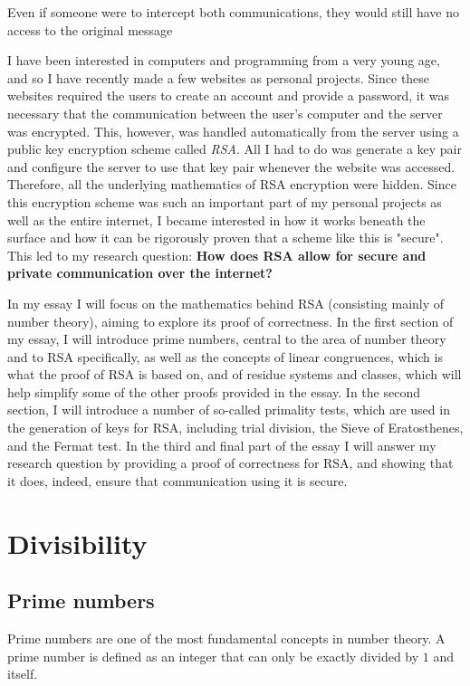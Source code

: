 \documentclass[12pt, titlepage]{article}
\begin{document}
    Even if someone were to intercept both communications, they would still have no access
    to the original message

    I have been interested in computers and programming from a very young age, and so I have
    recently made a few websites as personal projects. Since these websites required the
    users to create an account and provide a password, it was necessary that the
    communication between the user's computer and the server was encrypted. This, however,
    was handled automatically from the server using a public key encryption scheme called
    \emph{RSA}. All I had to do was generate a key pair and configure the server to use that
    key pair whenever the website was accessed.  Therefore, all the underlying mathematics
    of RSA encryption were hidden. Since this encryption scheme was such an important part
    of my personal projects as well as the entire internet, I became interested in how it
    works beneath the surface and how it can be rigorously proven that a scheme like this is
    "secure". This led to my research question: \textbf{How does RSA allow for secure and
    private communication over the internet?}

    In my essay I will focus on the mathematics behind RSA (consisting mainly of number
    theory), aiming to explore its proof of correctness. In the first section of my essay, I
    will introduce prime numbers, central to the area of number theory and to
    RSA specifically, as well as the concepts of linear congruences, which is what the proof
    of RSA is based on, and of residue systems and classes, which will help simplify some
    of the other proofs provided in the essay. In the second section, I will introduce a
    number of so-called primality tests, which are used in the generation of keys for RSA,
    including trial division, the Sieve of Eratosthenes, and the Fermat test. In the third
    and final part of the essay I will answer my research question by providing a proof of
    correctness for RSA, and showing that it does, indeed, ensure that communication using
    it is secure.

\section{Divisibility}
    \subsection{Prime numbers}
    Prime numbers are one of the most fundamental concepts in number theory. A prime number
    is defined as an integer that can only be exactly divided by $1$ and itself.
\end{document}

